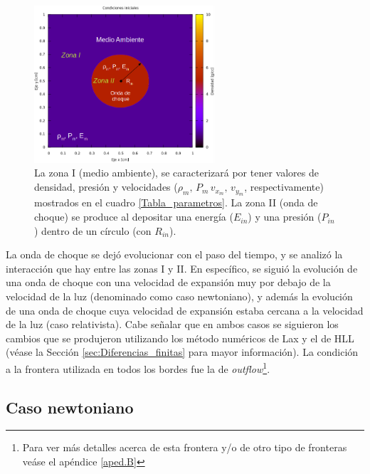 \documentclass[12pt,a4paper]{book}
\begin{document}
\begin{figure}[H]
\centering
\includegraphics[width=0.6\textwidth]{./Figuras/Pruebas/Prueba_onda_choque/prueba_example}
\caption{\label{fig:onda_choque_example}La zona I (medio ambiente), se caracterizará por tener valores de densidad, presión y velocidades ($\rho_m, \, P_m \, v_{x_m}, \, v_{y_m}$, respectivamente) mostrados en el cuadro \ref{Tabla_parametros}. La zona II (onda de choque) se produce al depositar una energía ($E_{in}$) y una presión ($P_{in}$) dentro de un círculo (con $R_{in}$).}
\end{figure}

La onda de choque se dejó evolucionar con el paso del tiempo, y se analizó la interacción que hay entre las zonas I y II. En específico, se siguió la evolución de una onda de choque con una velocidad de expansión muy por debajo de la velocidad de la luz (denominado como caso newtoniano), y además la evolución de una onda de choque cuya velocidad de expansión estaba cercana a la velocidad de la luz (caso relativista). Cabe señalar que en ambos casos se siguieron los cambios que se produjeron utilizando los método numéricos de Lax y el de HLL (véase la Sección \ref{sec:Diferencias_finitas} para mayor información). La condición a la frontera utilizada en todos los bordes fue la de \emph{outflow}\footnote{Para ver más detalles acerca de esta frontera y/o de otro tipo de fronteras veáse el apéndice \ref{aped.B}}. 





\subsection{Caso newtoniano} 
\end{document}
